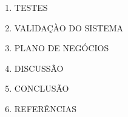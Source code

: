 \documentclass[a4paper]{article}
\begin{document}
\begin{enumerate}[label*=\arabic*.]
	\item TESTES
    
    \item VALIDAÇÀO DO SISTEMA
    
	\item PLANO DE NEGÓCIOS
	
	\item DISCUSSÃO
    
    \item CONCLUSÃO
    
    \item REFERÊNCIAS
    	

\end{enumerate}


\nocite {KUCHEMANN2012,CALERTA,ACRIT,FOLHA}


\end{document}
